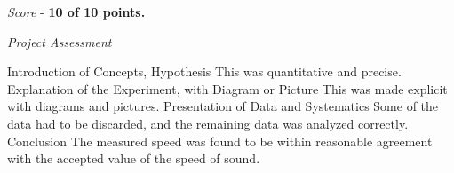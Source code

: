 \documentclass[10pt]{article}
\begin{document}
\textit{Score} - \textbf{10 of 10 points.}

\textit{Project Assessment}
\begin{outline}[enumerate]
\1 Introduction of Concepts, Hypothesis
\2 This was quantitative and precise.
\1 Explanation of the Experiment, with Diagram or Picture
\2 This was made explicit with diagrams and pictures.
\1 Presentation of Data and Systematics
\2 Some of the data had to be discarded, and the remaining data was analyzed correctly.
\1 Conclusion
\2 The measured speed was found to be within reasonable agreement with the accepted value of the speed of sound.
\end{outline}
\end{document}
